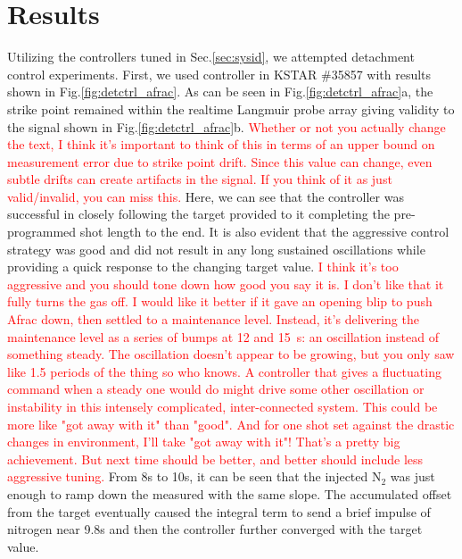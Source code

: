 \section{Results}
\label{sec:results}







Utilizing the controllers tuned in Sec.\ref{sec:sysid}, we attempted detachment control experiments.
First, we used \Afrac controller in KSTAR \#35857 with results shown in Fig.\ref{fig:detctrl_afrac}.
As can be seen in Fig.\ref{fig:detctrl_afrac}a, the strike point remained within the realtime Langmuir probe array giving validity to the \Afrac signal shown in Fig.\ref{fig:detctrl_afrac}b.
\textcolor{red}{Whether or not you actually change the text, I think it's important to think of this in terms of an upper bound on measurement error due to strike point drift. Since this value can change, even subtle drifts can create artifacts in the signal. If you think of it as just valid/invalid, you can miss this.}
Here, we can see that the controller was successful in closely following the target provided to it completing the pre-programmed shot length to the end.
It is also evident that the aggressive control strategy was good and did not result in any long sustained oscillations while providing a quick response to the changing target value.
\textcolor{red}{I think it's too aggressive and you should tone down how good you say it is. I don't like that it fully turns the gas off. I would like it better if it gave an opening blip to push Afrac down, then settled to a maintenance level. Instead, it's delivering the maintenance level as a series of bumps at 12 and 15~s: an oscillation instead of something steady. The oscillation doesn't appear to be growing, but you only saw like 1.5 periods of the thing so who knows. A controller that gives a fluctuating command when a steady one would do might drive some other oscillation or instability in this intensely complicated, inter-connected system. This could be more like "got away with it" than "good". And for one shot set against the drastic changes in environment, I'll take "got away with it"! That's a pretty big achievement. But next time should be better, and better should include less aggressive tuning.}
From 8s to 10s, it can be seen that the injected N$_2$ was just enough to ramp down the measured \Afrac with the same slope.
The accumulated offset from the target eventually caused the integral term to send a brief impulse of nitrogen near 9.8s and then the controller further converged with the target value.
